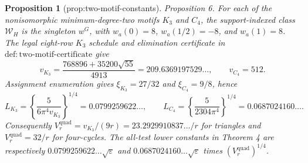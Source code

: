 \documentclass{article}
\newtheorem{proposition}{Proposition}
\begin{document}
\begin{proposition}[prop:two-motif-constants]\label{prop:two-motif-constants}
Proposition 6. For each of the nonisomorphic minimum-degree-two motifs \(K_3\) and \(C_4\), the support-indexed class \(\mathcal W_H\) is the singleton \(w^G\), with \(w_a(0)=8\), \(w_a(1/2)=-8\), and \(w_a(1)=8\). The legal eight-row \(K_3\) schedule and elimination certificate in \(\mathrm{def:two\text{-}motif\text{-}certificate}\) give \[v_{K_3}=\frac{768896+35200\sqrt{55}}{4913}=209.6369197529\ldots,\qquad v_{C_4}=512.\] Assignment enumeration gives \(\xi_{K_3}=27/32\) and \(\xi_{C_4}=9/8\), hence \[L_{K_3}=\left\{\frac{5}{6\pi^4v_{K_3}}\right\}^{1/4}=0.0799259622\ldots,\qquad L_{C_4}=\left\{\frac{5}{2304\pi^4}\right\}^{1/4}=0.0687024160\ldots.\] Consequently \(V^{\mathrm{quad}}_r=v_{K_3}/(9r)=23.2929910837\ldots/r\) for triangles and \(V^{\mathrm{quad}}_r=32/r\) for four-cycles. The all-test lower constants in Theorem 4 are respectively \(0.0799259622\ldots\sqrt{\varepsilon}\) and \(0.0687024160\ldots\sqrt{\varepsilon}\) times \((V^{\mathrm{quad}}_r)^{1/4}\).
\end{proposition}
\end{document}
